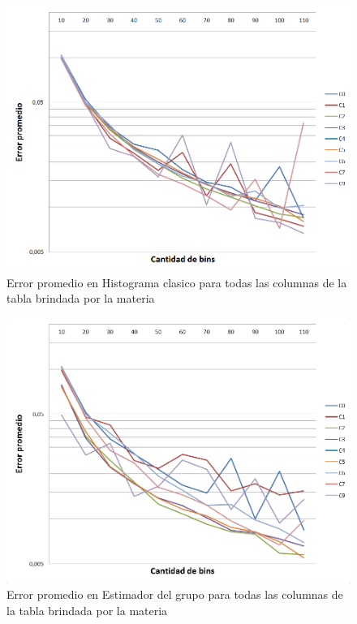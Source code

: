 \begin{figure}[H]
	    \includegraphics[scale=.60]{imagenes/variacion_parametro_y_columna_histo.png}
	    \caption{Error promedio en Histograma clasico para todas las columnas de la tabla brindada por la materia} 
	    \label{fig:variacion_parametro_y_columna_histo}
\end{figure}

\begin{figure}[H]
	    \includegraphics[scale=.60]{imagenes/variacion_parametro_y_columna_grupo.png}
	    \caption{Error promedio en Estimador del grupo para todas las columnas de la tabla brindada por la materia} 
	    \label{fig:variacion_parametro_y_columna_grupo}
\end{figure}

